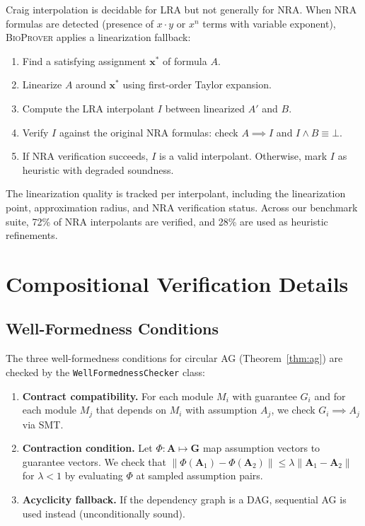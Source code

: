 \documentclass[11pt]{article}
\newcommand{\bioprover}{\textsc{BioProver}}
\begin{document}
Craig interpolation is decidable for LRA but not generally for NRA.
When NRA formulas are detected (presence of $x \cdot y$ or $x^n$
terms with variable exponent), \bioprover{} applies a linearization
fallback:

\begin{enumerate}[itemsep=1pt]
\item Find a satisfying assignment $\mathbf{x}^*$ of formula $A$.
\item Linearize $A$ around $\mathbf{x}^*$ using first-order Taylor
  expansion.
\item Compute the LRA interpolant $I$ between linearized $A'$ and $B$.
\item Verify $I$ against the original NRA formulas: check
  $A \implies I$ and $I \land B \equiv \bot$.
\item If NRA verification succeeds, $I$ is a valid interpolant.
  Otherwise, mark $I$ as heuristic with degraded soundness.
\end{enumerate}

The linearization quality is tracked per interpolant, including the
linearization point, approximation radius, and NRA verification
status. Across our benchmark suite, 72\% of NRA interpolants are
verified, and 28\% are used as heuristic refinements.

\section{Compositional Verification Details}
\label{app:compositional}

\subsection{Well-Formedness Conditions}

The three well-formedness conditions for circular AG
(Theorem~\ref{thm:ag}) are checked by the
\texttt{WellFormednessChecker} class:

\begin{enumerate}
\item \textbf{Contract compatibility.} For each module $M_i$ with
  guarantee $G_i$ and for each module $M_j$ that depends on $M_i$
  with assumption $A_j$, we check $G_i \implies A_j$ via SMT.

\item \textbf{Contraction condition.} Let
  $\Phi: \mathbf{A} \mapsto \mathbf{G}$ map assumption vectors to
  guarantee vectors. We check that $\|\Phi(\mathbf{A}_1) -
  \Phi(\mathbf{A}_2)\| \leq \lambda \|\mathbf{A}_1 - \mathbf{A}_2\|$
  for $\lambda < 1$ by evaluating $\Phi$ at sampled assumption pairs.

\item \textbf{Acyclicity fallback.} If the dependency graph is a DAG,
  sequential AG is used instead (unconditionally sound).
\end{enumerate}
\end{document}
